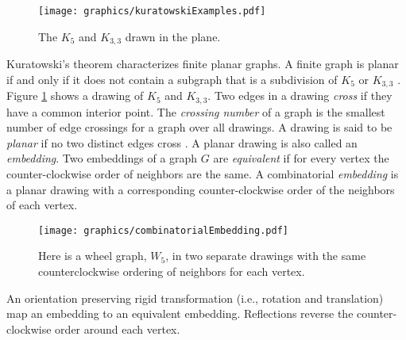 \documentclass[10pt]{CSUNthesis}
\theoremstyle{plain}%
\theoremstyle{definition}
\theoremstyle{remark}
\begin{document}
\begin{figure}[!htbp]
\begin{center}
\texttt{[image: graphics/kuratowskiExamples.pdf]}
\caption{The $K_5$ and $K_{3,3}$ drawn in the plane.}\label{fig:kuratowskiExamples.pdf}
\end{center} 
\end{figure} 
Kuratowski's theorem characterizes finite planar graphs.
A finite graph is planar if and only if it does not contain a subgraph that is a subdivision of $K_5$ or $K_{3,3}$ \cite{kuratowski1930probleme}. 
Figure \ref{fig:kuratowskiExamples.pdf} shows a drawing of $K_5$ and $K_{3,3}$.
Two edges in a drawing \textit{cross} if they have a common interior point.  
The \textit{crossing number} of a graph is the smallest number of edge crossings for a graph over all drawings.
A drawing is said to be \textit{planar} if no two distinct edges cross \cite{BET+99}.
A planar drawing is also called an \textit{embedding}.
Two embeddings of a graph $G$ are \textit{equivalent} if for every vertex the counter-clockwise order of neighbors are the same.%
A combinatorial \textit{embedding} is a planar drawing with a corresponding counter-clockwise order of the neighbors of each vertex. 
\begin{figure}[!htbp]
\begin{center}
    \texttt{[image: graphics/combinatorialEmbedding.pdf]}
    \caption{Here is a wheel graph, $W_5$, in two separate drawings with the same counterclockwise ordering of neighbors for each vertex.}\label{fig:combinatorialEmbedding.pdf}
\end{center}
\end{figure}
An orientation preserving rigid transformation (i.e., rotation and translation) map an embedding to an equivalent embedding.  
Reflections reverse the counter-clockwise order around each vertex.
\end{document}
